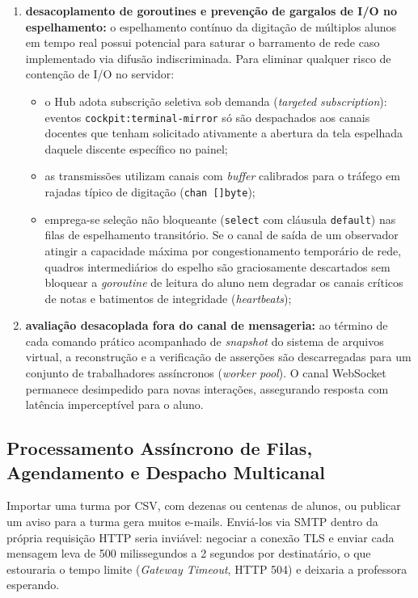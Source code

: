 \begin{enumerate}
    \item \textbf{desacoplamento de goroutines e prevenção de gargalos de I/O no espelhamento:} o espelhamento contínuo da digitação de múltiplos alunos em tempo real possui potencial para saturar o barramento de rede caso implementado via difusão indiscriminada. Para eliminar qualquer risco de contenção de I/O no servidor:
    \begin{itemize}
        \item o Hub adota subscrição seletiva sob demanda (\textit{targeted subscription}): eventos \texttt{cockpit:terminal-mirror} só são despachados aos canais docentes que tenham solicitado ativamente a abertura da tela espelhada daquele discente específico no painel;
        \item as transmissões utilizam canais com \textit{buffer} calibrados para o tráfego em rajadas típico de digitação (\texttt{chan []byte});
        \item emprega-se seleção não bloqueante (\texttt{select} com cláusula \texttt{default}) nas filas de espelhamento transitório. Se o canal de saída de um observador atingir a capacidade máxima por congestionamento temporário de rede, quadros intermediários do espelho são graciosamente descartados sem bloquear a \textit{goroutine} de leitura do aluno nem degradar os canais críticos de notas e batimentos de integridade (\textit{heartbeats});
    \end{itemize}

    \item \textbf{avaliação desacoplada fora do canal de mensageria:} ao término de cada comando prático acompanhado de \textit{snapshot} do sistema de arquivos virtual, a reconstrução e a verificação de asserções são descarregadas para um conjunto de trabalhadores assíncronos (\textit{worker pool}). O canal WebSocket permanece desimpedido para novas interações, assegurando resposta com latência imperceptível para o aluno.
\end{enumerate}

\subsection{Processamento Assíncrono de Filas, Agendamento e Despacho Multicanal}
\label{sec:filas-emails-assincronos}

Importar uma turma por CSV, com dezenas ou centenas de alunos, ou publicar um aviso para a turma gera muitos e-mails. Enviá-los via SMTP dentro da própria requisição HTTP seria inviável: negociar a conexão TLS e enviar cada mensagem leva de 500 milissegundos a 2 segundos por destinatário, o que estouraria o tempo limite (\textit{Gateway Timeout}, HTTP 504) e deixaria a professora esperando.

